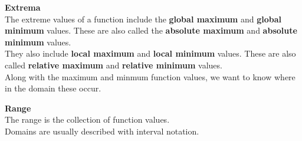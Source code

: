 \documentclass{ximera}
\begin{document}
\begin{explanation}  \textbf{\textcolor{blue!75!black}{Extrema}} \\

The extreme values of a function include the \textbf{\textcolor{purple!85!blue}{global maximum}} and \textbf{\textcolor{purple!85!blue}{global minimum}} values. These are also called the \textbf{\textcolor{purple!85!blue}{absolute maximum}} and \textbf{\textcolor{purple!85!blue}{absolute minimum}} values.  \\

They also include \textbf{\textcolor{purple!85!blue}{local maximum}} and \textbf{\textcolor{purple!85!blue}{local minimum}} values. These are also called \textbf{\textcolor{purple!85!blue}{relative maximum}} and \textbf{\textcolor{purple!85!blue}{relative minimum}} values.  \\


Along with the maximum and minmum function values, we want to know where in the domain these occur.


\end{explanation}







\begin{explanation}  \textbf{\textcolor{blue!75!black}{Range}} \\

The range is the collection of function values. \\

Domains are usually described with interval notation.

\end{explanation}
\end{document}
